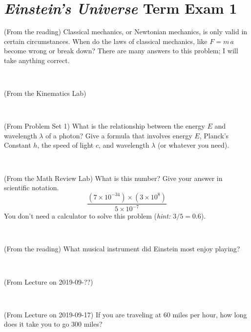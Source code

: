 \documentclass[12pt, letterpaper]{article}
\begin{document}
\section*{\textsl{Einstein's Universe} Term Exam 1}
\setcounter{problem}{1}


\begin{problem} (From the reading)
Classical mechanics, or Newtonian mechanics, is only valid in certain
circumstances. When do the laws of classical mechanics, like $F =
m\,a$ become wrong or break down? There are many answers to this
problem; I will take anything correct.
\end{problem}


\vfill ~

\begin{problem} (From the Kinematics Lab)

\end{problem}


\vfill ~

\begin{problem} (From Problem Set 1)
What is the relationship between the energy $E$ and wavelength
$\lambda$ of a photon? Give a formula that involves energy $E$,
Planck's Constant $h$, the speed of light $c$, and wavelength
$\lambda$ (or whatever you need).
\end{problem}

\vfill ~

\begin{problem} (From the Math Review Lab)
What is this number? Give your answer in scientific notation.
$$
\frac{(7\times10^{-34})\times(3\times10^8)}{5\times10^{-7}}
$$
You don't need a calculator to solve this problem (\textit{hint: $3/5=0.6$}).
\end{problem}


\vfill ~


\clearpage


\begin{problem} (From the reading)
What musical instrument did Einstein most enjoy playing?
\end{problem}


\vfill ~

\begin{problem} (From Lecture on 2019-09-??)
\end{problem}


\vfill ~

\begin{problem} (From Lecture on 2019-09-17)
If you are traveling at 60 miles per hour, how long does
it take you to go 300 miles?
\end{problem}
\end{document}
